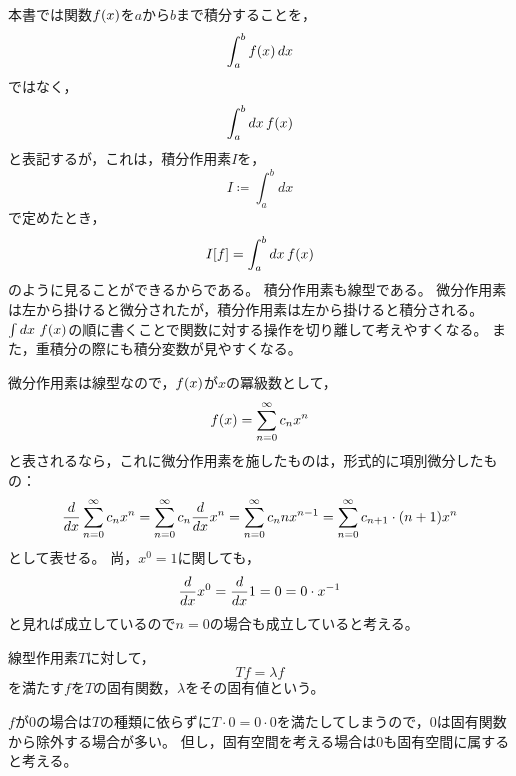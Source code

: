 \documentclass[a4paper,draft]{ltjsarticle}
\begin{document}
\begin{rem}
    本書では関数$\fun{f}{x}$を$a$から$b$まで積分することを，
    \begin{equation}
        \int_a^b \fun{f}{x}\, dx
    \end{equation}
    ではなく，
    \begin{equation}
        \int_a^b dx\, \fun{f}{x}
    \end{equation}
    と表記するが，これは，積分作用素$I$を，
    \begin{equation}
        I\coloneqq \int_a^b dx
    \end{equation}
    で定めたとき，
    \begin{equation}
        I\squ{f}=\int_a^b dx\, \fun{f}{x}
    \end{equation}
    のように見ることができるからである。
    積分作用素も線型である。
    微分作用素は左から掛けると微分されたが，積分作用素は左から掛けると積分される。
    $\int dx\ \fun{f}{x}$の順に書くことで関数に対する操作を切り離して考えやすくなる。
    また，重積分の際にも積分変数が見やすくなる。
\end{rem}


微分作用素は線型なので，$\fun{f}{x}$が$x$の冪級数として，
\begin{equation}
    \fun{f}{x}=\sum_{n=0}^\infty c_n x^n
\end{equation}
と表されるなら，これに微分作用素を施したものは，形式的に項別微分したもの：
\begin{equation}
    \diff{}{x}\sum_{n=0}^\infty c_nx^n=\sum_{n=0}^\infty c_n\diff{}{x}x^n=\sum_{n=0}^\infty c_n nx^{n-1}=\sum_{n=0}^\infty c_{n+1}\cdot \pare{n+1}x^n
\end{equation}
として表せる。
尚，$x^0=1$に関しても，
\begin{equation}
    \frac{d }{d x}x^0=\frac{d }{d x}1=0=0\cdot x^{-1}
\end{equation}
と見れば成立しているので$n=0$の場合も成立していると考える。

\begin{defi}[固有関数]
    線型作用素$T$に対して，
    \begin{equation}
        Tf=\lambda f
    \end{equation}
    を満たす$f$を$T$の固有関数，$\lambda$をその固有値という。
\end{defi}

$f$が$0$の場合は$T$の種類に依らずに$T\cdot 0 = 0\cdot 0$を満たしてしまうので，$0$は固有関数から除外する場合が多い。
但し，固有空間を考える場合は$0$も固有空間に属すると考える。
\end{document}
